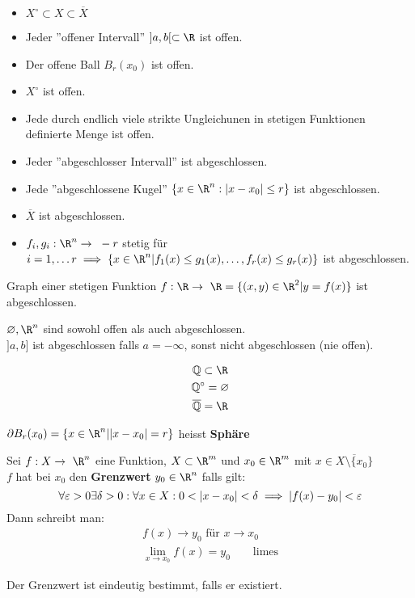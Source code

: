 \begin{bem}
	\begin{itemize}
		\item $X^\circ \subset X \subset \overline{X}$
		
		\item Jeder ''offener Intervall'' $]a,b[ \subset \R$ ist offen.
		\item Der offene Ball $B_r(x_0)$ ist offen.
		\item $X^\circ$ ist offen.
		\item Jede durch endlich viele strikte Ungleichunen in stetigen Funktionen definierte Menge ist offen.
		
		\item Jeder ''abgeschlosser Intervall'' ist abgeschlossen.
		\item Jede ''abgeschlossene Kugel'' $\{ x \in \R^n : \abs{x-x_0} \leq r \}$ ist abgeschlossen.
		\item $\overline{X}$ ist abgeschlossen.
		\item $f_i, g_i: \R^n \rightarrow -r$ stetig für $i = 1, \dotsc r \implies \{ x \in \R^n | f_1(x) \leq g_1(x), \dotsc , f_r(x) \leq g_r(x) \}$ ist abgeschlossen.
	\end{itemize}
\end{bem}
\begin{bsp*}
	Graph einer stetigen Funktion $f: \R \rightarrow \R = \{ (x,y) \in \R^2 | y = f(x) \}$ ist abgeschlossen.
\end{bsp*}
\begin{bem}
	$\varnothing, \R^n$ sind sowohl offen als auch abgeschlossen.\\
	$]a,b]$ ist abgeschlossen falls $a = -\infty$, sonst nicht abgeschlossen (nie offen).
\end{bem}
\begin{bsp*}
	\begin{gather*}
		\Q \subset \R \\
		\Q^\circ = \varnothing \\
		\overline{\Q} = \R
	\end{gather*}
\end{bsp*}
\begin{bem}
	$\partial B_r(x_0) = \{ x \in \R^n | \abs{x-x_0} = r \}$ heisst \textbf{Sphäre}
\end{bem}
\begin{def*}[note = Grenzwert , index = Grenzwert]
	Sei $f: X \rightarrow \R^n$ eine Funktion, $X \subset \R^m$ und $x_0 \in \R^m$ mit $x \in \overline{X \setminus \{ x_0 \}}$\\
	$f$ hat bei $x_0$ den \textbf{Grenzwert} $y_0 \in \R^n$ falls gilt:
	\[ \forall \epsilon > 0 \exists \delta > 0 : \forall x \in X : 0 < \abs{x-x_0} < \delta \implies \abs{f(x) - y_0} < \epsilon \]
	Dann schreibt man:
	\begin{gather*}
		f(x) \rightarrow y_0 \text{ für } x \rightarrow x_0 \\
		\lim_{x \rightarrow x_0} f(x) = y_0 \qquad \text{limes}
	\end{gather*}
	\begin{bem}
		Der Grenzwert ist eindeutig bestimmt, falls er existiert.
	\end{bem}
\end{def*}
